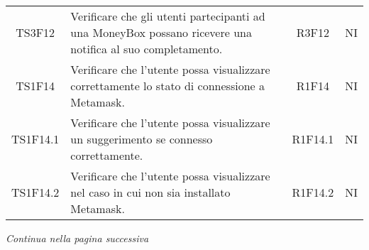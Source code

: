 \begin{table}[H]
\begin{tabular}{c|p{8cm}|c|c}
    TS3F12    & Verificare che gli utenti partecipanti ad una MoneyBox\glo{} possano ricevere una notifica al suo completamento.            & R3F12    & NI \\
    TS1F14    & Verificare che l'utente possa visualizzare correttamente lo stato di connessione a Metamask\glo{}.                          & R1F14    & NI \\
    TS1F14.1  & Verificare che l'utente possa visualizzare un suggerimento se connesso correttamente.                                       & R1F14.1  & NI \\
    TS1F14.2  & Verificare che l'utente possa visualizzare nel caso in cui non sia installato Metamask\glo{}.                               & R1F14.2  & NI \\
  \end{tabular}
\end{table}
\begin{center}
  \textit{\small Continua nella pagina successiva}
\end{center}
